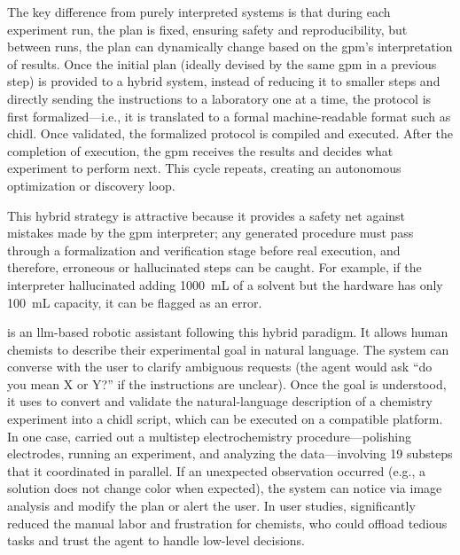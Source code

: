The key difference from purely interpreted systems is that during each experiment run, the plan is fixed, ensuring safety and reproducibility, but between runs, the plan can dynamically change based on the \gls{gpm}’s interpretation of results. 
Once the initial plan (ideally devised by the same \gls{gpm} in a previous step) is provided to a hybrid system, instead of reducing it to smaller steps and directly sending the instructions to a laboratory one at a time, the protocol is first formalized---i.e., it is translated to a formal machine-readable format such as \gls{chidl}. Once validated, the formalized protocol is compiled and executed. After the completion of execution, the \gls{gpm} receives the results and decides what experiment to perform next. This cycle repeats, creating an autonomous optimization or discovery loop. 

This hybrid strategy is attractive because it provides a safety net against mistakes made by the \gls{gpm} interpreter; any generated procedure must pass through a formalization and verification stage before real execution, and therefore, erroneous or hallucinated steps can be caught. For example, if the interpreter hallucinated adding \SI{1000}{\milli\liter} of a solvent but the hardware has only \SI{100}{\milli\liter} capacity, it can be flagged as an error. 



 \autocite{darvish2025organa} is an \gls{llm}-based robotic assistant following this hybrid paradigm. 
It allows human chemists to describe their experimental goal in natural language. The system can converse with the user to clarify ambiguous requests (the agent would ask \enquote{do you mean X or Y?} if the instructions are unclear). Once the goal is understood, it uses  \autocite{Yoshikawa2023CLAIRify} to convert and validate the natural-language description of a chemistry experiment into a \gls{chidl} script, which can be executed on a compatible platform. 
In one case,  carried out a multistep electrochemistry procedure---polishing electrodes, running an experiment, and analyzing the data---involving 19 substeps that it coordinated in parallel. 
If an unexpected observation occurred (e.g., a solution does not change color when expected), the system can notice via image analysis and modify the plan or alert the user. 
In user studies,  significantly reduced the manual labor and frustration for chemists, who could offload tedious tasks and trust the agent to handle low-level decisions.

